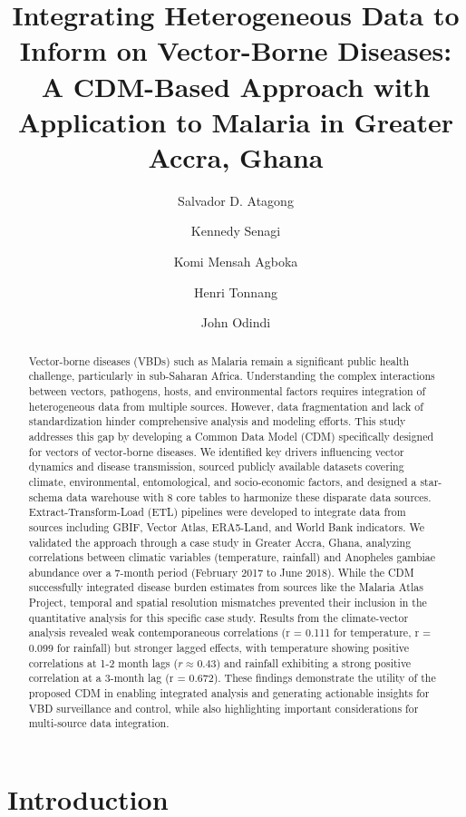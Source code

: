 \documentclass{article}
\title{Integrating Heterogeneous Data to Inform on Vector-Borne Diseases: A CDM-Based Approach with Application 
to Malaria in Greater Accra, Ghana}
\author[1,2]{Salvador D. Atagong}
\author[1]{Kennedy Senagi}
\author[1]{Komi Mensah Agboka}
\author[2,3]{Henri Tonnang}
\author[2]{John Odindi}
\affil[1]{International Center of Insect Physiology and Ecology (ICIPE)}
\affil[2]{University of KwaZulu-Natal, South Africa}
\affil[3]{International Institute of Tropical Agriculture (IITA), Ibadan, Nigeria}
\date{}
\begin{document}
\maketitle

\begin{abstract}
Vector-borne diseases (VBDs) such as Malaria remain a significant public health challenge, particularly in sub-Saharan 
Africa. Understanding the complex interactions between vectors, pathogens, hosts, and environmental factors requires 
integration of heterogeneous data from multiple sources. However, data fragmentation and lack of standardization hinder 
comprehensive analysis and modeling efforts. This study addresses this gap by developing a Common Data Model (CDM) 
specifically designed for vectors of vector-borne diseases. We identified key drivers influencing vector dynamics and 
disease transmission, sourced publicly available datasets covering climate, environmental, entomological, and socio-economic 
factors, and designed a star-schema data warehouse with 8 core tables to harmonize these disparate data sources. 
Extract-Transform-Load (ETL) pipelines were developed to integrate data from sources including GBIF, Vector Atlas, 
ERA5-Land, and World Bank indicators. We validated the approach through a case study in Greater Accra, Ghana, analyzing 
correlations between climatic variables (temperature, rainfall) and Anopheles gambiae abundance over a 7-month period 
(February 2017 to June 2018). While the CDM successfully integrated disease burden estimates from sources like the Malaria 
Atlas Project, temporal and spatial resolution mismatches prevented their inclusion in the quantitative analysis for this 
specific case study. Results from the climate-vector analysis revealed weak contemporaneous correlations (r = 0.111 for 
temperature, r = 0.099 for rainfall) but stronger lagged effects, with temperature showing positive correlations at 1-2 
month lags ($r \approx 0.43$) and rainfall exhibiting a strong positive correlation at a 3-month lag (r = 0.672). These 
findings demonstrate the utility of the proposed CDM in enabling integrated analysis and generating actionable insights 
for VBD surveillance and control, while also highlighting important considerations for multi-source data integration.
\end{abstract}

\section{Introduction}
\label{sec:intro}
\end{document}
